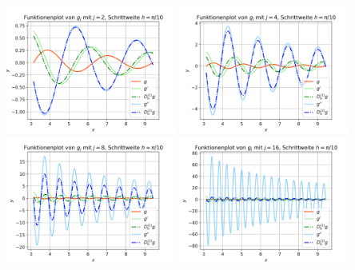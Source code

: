 \documentclass{scrartcl}
\begin{document}
\vspace{0.4cm}
{
  \centering
    \includegraphics[width=0.42\textwidth]{Grafiken/Funktionenplot_j2_Pi_Zehntel}
    \includegraphics[width=0.42\textwidth]{Grafiken/Funktionenplot_j4_Pi_Zehntel}\\
    \includegraphics[width=0.42\textwidth]{Grafiken/Funktionenplot_j8_Pi_Zehntel}
    \includegraphics[width=0.42\textwidth]{Grafiken/Funktionenplot_j16_Pi_Zehntel}\\
    \vspace{-0.2cm}

}
\end{document}
